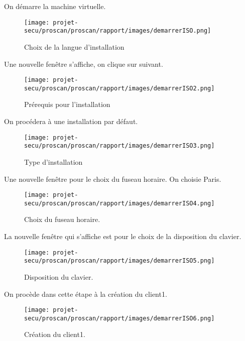\documentclass[11pt,a4paper,titlepage, oneside]{article}
\begin{document}
		On démarre la machine virtuelle.
	\newpage
		\begin{figure}[h]
                        \centering
                        \texttt{[image: projet-secu/proscan/proscan/rapport/images/demarrerISO.png]}
                        \caption{Choix de la langue d'installation}
                \end{figure}
		Une nouvelle fenêtre s'affiche, on clique sur suivant.
		 \begin{figure}[h]
                        \centering
                        \texttt{[image: projet-secu/proscan/proscan/rapport/images/demarrerISO2.png]}
                        \caption{Prérequis pour l'installation}
                \end{figure}
	\newpage
		On procédera à une installation par défaut.
		 \begin{figure}[h]
                        \centering
                        \texttt{[image: projet-secu/proscan/proscan/rapport/images/demarrerISO3.png]}
                        \caption{Type d'installation}
                \end{figure}
		
	\newpage
		Une nouvelle fenêtre pour le choix du fuseau horaire. On choisie Paris.
		 \begin{figure}[h]
                        \centering
                        \texttt{[image: projet-secu/proscan/proscan/rapport/images/demarrerISO4.png]}
                        \caption{Choix du fuseau horaire.}
                \end{figure}
	\newpage
		La nouvelle fenêtre qui s'affiche est pour le choix de la disposition du clavier.

		 \begin{figure}[h]
                        \centering
                        \texttt{[image: projet-secu/proscan/proscan/rapport/images/demarrerISO5.png]}
                        \caption{Disposition du clavier.}
                \end{figure}

		\newpage

		On procède dans cette étape à la création du client1.	
		\begin{figure}[h]
                        \centering
                        \texttt{[image: projet-secu/proscan/proscan/rapport/images/demarrerISO6.png]}
                        \caption{Création du client1.}
                \end{figure}
\end{document}
